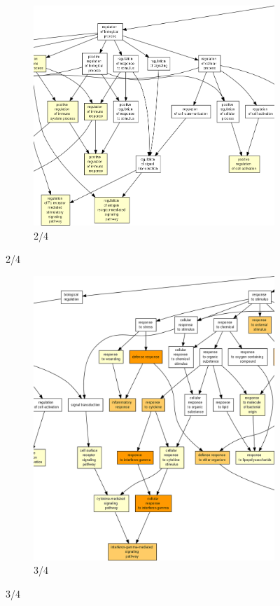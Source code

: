 \begin{figure}[p]
\ContinuedFloat
\begin{subfigure}{\textwidth}
\includegraphics[width=\textwidth]
{Figures/hlc-go-pot-down/hlc-go-pot-down_1.png}
\caption{2/4}
\end{subfigure}
\end{figure}

\begin{figure}[p]
\ContinuedFloat
\begin{subfigure}{\textwidth}
\includegraphics[width=\textwidth]
{Figures/hlc-go-pot-down/hlc-go-pot-down_2.png}
\caption{3/4}
\end{subfigure}
\end{figure}

